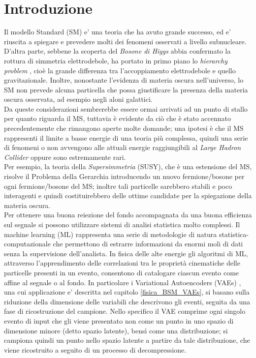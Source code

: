 %
\section{Introduzione}
\label{sec:introduzione}
%
Il modello Standard (SM) e' una teoria che ha avuto grande successo, ed e' riuscita a spiegare e prevedere molti dei fenomeni osservati a livello subnucleare. D'altra parte, sebbene la scoperta del \textit{Bosone di Higgs} \cite{Bosone_di_Higgs} abbia confermato la rottura di simmetria elettrodebole, ha portato in primo piano lo \textit{hierarchy problem} \cite{PG1,PG2,PG3,PG4}, cioè la grande differenza tra l'accoppiamento elettrodebole e quello gravitazionale. Inoltre, nonostante l'evidenza di materia oscura nell'universo, lo SM non prevede alcuna particella che possa giustificare la presenza della materia oscura osservata, ad esempio negli aloni galattici. \\
Da queste considerazioni sembrerebbe essere ormai arrivati ad un punto di stallo per quanto riguarda il MS, tuttavia è evidente da ciò che è stato accennato precedentemente che rimangono aperte molte domande; una ipotesi è che il MS rappresenti il limite a basse energie di una teoria più complessa, quindi una serie di fenomeni o non avvengono alle attuali energie raggiungibili al \textit{Large Hadron Collider} oppure sono estremamente rari. \\
Per esempio, la teoria della \textit{Supersimmetria} (SUSY), che è una estensione del MS, risolve il Problema della Gerarchia introducendo un nuovo fermione/bosone per ogni fermione/bosone del MS; inoltre tali particelle sarebbero stabili e poco interagenti e quindi costituirebbero delle ottime candidate per la spiegazione della materia oscura. \\
Per ottenere una buona reiezione del fondo accompagnata da una buona efficienza sul segnale si possono utilizzare  sistemi di analisi statistica molto complessi. Il machine learning (ML) rappresenta una serie di metodologie di natura statistica-computazionale che permettono di estrarre informazioni da enormi moli di dati senza la supervisione dell'analista. In fisica delle alte energie gli algoritmi di ML, attraverso l'apprendimento delle correlazioni tra le proprietà cinematiche delle particelle presenti in un evento, consentono di catalogare ciascun evento come affine al segnale o al fondo. In particolare i Variational Autoencoders (VAEs) \cite{Understanding_VAEs}, una cui applicazione e' descritta nel capitolo \ref{fisica_BSM_VAEs}, si basano sulla riduzione della dimensione delle variabili che descrivono gli eventi, seguita da una fase di ricostruzione del campione. Nello specifico il VAE comprime ogni singolo evento di input che gli viene presentato non come un punto in uno spazio di dimensione minore (detto spazio latente), bensì come una distribuzione; si campiona quindi un punto nello spazio latente a partire da tale distribuzione, che viene ricostruito a seguito di un processo di decompressione. \\
